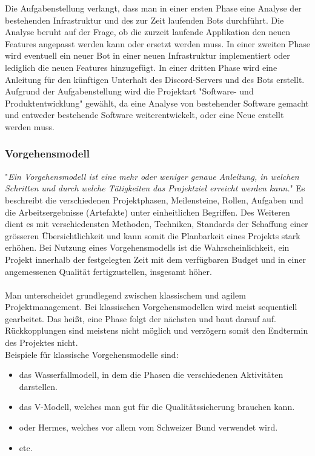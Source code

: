 \documentclass[a4paper, table]{article}
\begin{document}
Die Aufgabenstellung verlangt, dass man in einer ersten Phase eine Analyse der bestehenden Infrastruktur und des zur Zeit laufenden Bots durchführt. 
Die Analyse beruht auf der Frage, ob die zurzeit laufende Applikation den neuen Features angepasst werden kann oder ersetzt werden muss. 
In einer zweiten Phase wird eventuell ein neuer Bot in einer neuen Infrastruktur implementiert oder lediglich die neuen Features hinzugefügt. 
In einer dritten Phase wird eine Anleitung für den künftigen Unterhalt des Discord-Servers und des Bots erstellt.\\
Aufgrund der Aufgabenstellung wird die Projektart "Software- und Produktentwicklung" gewählt, da eine Analyse von bestehender Software gemacht und entweder bestehende Software weiterentwickelt, oder eine Neue erstellt werden muss.

\subsubsection{Vorgehensmodell}\label{Vorgehensmodell}
"\textit{Ein Vorgehensmodell ist eine mehr oder weniger genaue Anleitung, in welchen Schritten und durch welche Tätigkeiten das Projektziel
erreicht werden kann.}"\autocite{sarre_lufthansa-reservierung_2009}
Es beschreibt die verschiedenen Projektphasen, Meilensteine, Rollen, Aufgaben und die Arbeitsergebnisse (Artefakte) unter einheitlichen Begriffen. 
Des Weiteren dient es mit verschiedensten Methoden, Techniken, Standards der Schaffung einer grösseren Übersichtlichkeit und kann somit die Planbarkeit eines Projekts stark erhöhen. 
Bei Nutzung eines Vorgehensmodells ist die Wahrscheinlichkeit, ein Projekt innerhalb der festgelegten Zeit mit dem verfügbaren Budget und in einer angemessenen Qualität fertigzustellen, insgesamt höher. \autocite{jenny_projektmanagement_2016}\\\\ %
Man unterscheidet grundlegend zwischen klassischem und agilem Projektmanagement. 
Bei klassischen Vorgehensmodellen wird meist sequentiell gearbeitet. 
Das heißt, eine Phase folgt der nächsten und baut darauf auf. 
Rückkopplungen sind meistens nicht möglich und verzögern somit den Endtermin des Projektes nicht.\\
Beispiele für klassische Vorgehensmodelle sind:
\begin{itemize}
    \item das Wasserfallmodell, in dem die Phasen die verschiedenen Aktivitäten darstellen.
    \item das V-Modell, welches man gut für die Qualitätssicherung brauchen kann.
    \item oder Hermes, welches vor allem vom Schweizer Bund verwendet wird.
    \item etc.
\end{itemize}
\end{document}
